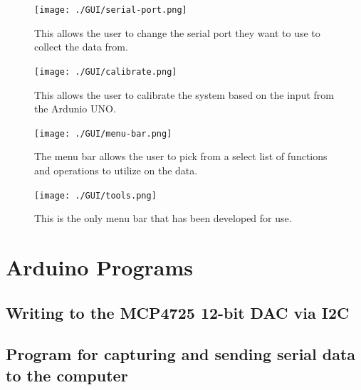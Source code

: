 \documentclass[12pt,journal]{IEEEtran}
\newcommand\arduinostyle{\lstset{%
    language=C++,
    basicstyle=\footnotesize,%
    frame=tb,                         %
    showstringspaces=false            %
}}
\newcommand\arduinoexternal[2][]{{
\arduinostyle
}}
\begin{document}
\begin{appendices}
\begin{figure}[h!]
	\centering
	\texttt{[image: ./GUI/serial-port.png]}
	\caption{This allows the user to change the serial port they want to use to collect the data from.}
	\label{fig:GUI-serial-port}
\end{figure}
\newpage

\begin{figure}[h!]
	\centering
	\texttt{[image: ./GUI/calibrate.png]}
	\caption{This allows the user to calibrate the system based on the input from the Ardunio UNO.}
	\label{fig:GUI-calibrate}
\end{figure}
\newpage

\begin{figure}[h!]
	\centering
	\texttt{[image: ./GUI/menu-bar.png]}
	\caption{The menu bar allows the user to pick from a select list of functions and operations to utilize on the data.}
	\label{fig:GUI-menu-bar}
\end{figure}
\newpage

\begin{figure}[h!]
	\centering
	\texttt{[image: ./GUI/tools.png]}
	\caption{This is the only menu bar that has been developed for use.}
	\label{fig:GUI-tools}
\end{figure}

\newpage



\section{Arduino Programs} \label{software:arduino}

\subsection{Writing to the MCP4725 12-bit DAC via I2C}

\arduinoexternal{../App/Arduino/sFPI-driver/sFPI-driver.ino}

\subsection{Program for capturing and sending serial data to the computer} \label{serial-data}

\arduinoexternal{../App/Arduino/Serial-data/Serial-data.ino}



\end{appendices}
\end{document}
